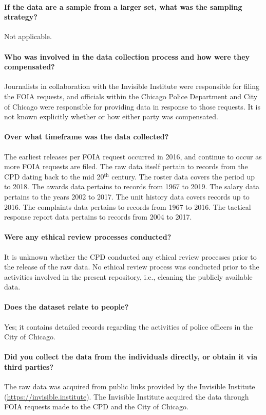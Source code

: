\paragraph{If the data are a sample from a larger set, what was the sampling strategy?}
Not applicable. 

\paragraph{Who was involved in the data collection process and how were they compensated?}
Journalists in collaboration with the Invisible Institute were responsible for filing
the FOIA requests, and officials within the Chicago Police Department and City of Chicago were responsible
for providing data in response to those requests. It is not known explicitly whether or how 
either party was compensated.

\paragraph{Over what timeframe was the data collected?}
The earliest releases per FOIA request occurred in 2016, and continue to occur
as more FOIA requests are filed. The raw data itself pertain to records from the CPD
dating back to the mid 20$^\text{th}$ century. The roster data covers the period up
to 2018. The awards data pertains to records from 1967 to 2019.
The salary data pertains to the years 2002 to 2017. The unit history data covers records up
to 2016. The complaints data pertains to records from 1967 to 2016. The tactical response 
report data pertains to records from 2004 to 2017.

\paragraph{Were any ethical review processes conducted?}
It is unknown whether the CPD conducted any ethical review processes prior to the release
of the raw data. No ethical review process was conducted prior to the activities
involved in the present repository, i.e., cleaning the publicly available data.

\paragraph{Does the dataset relate to people?}
Yes; it contains detailed records regarding the activities of police officers in the City of Chicago.

\paragraph{Did you collect the data from the individuals directly, or obtain it via third parties?}
The raw data was acquired from public links provided by the Invisible Institute (\url{https://invisible.institute}).
The Invisible Institute acquired the data through FOIA requests made to the CPD and the City of Chicago.

